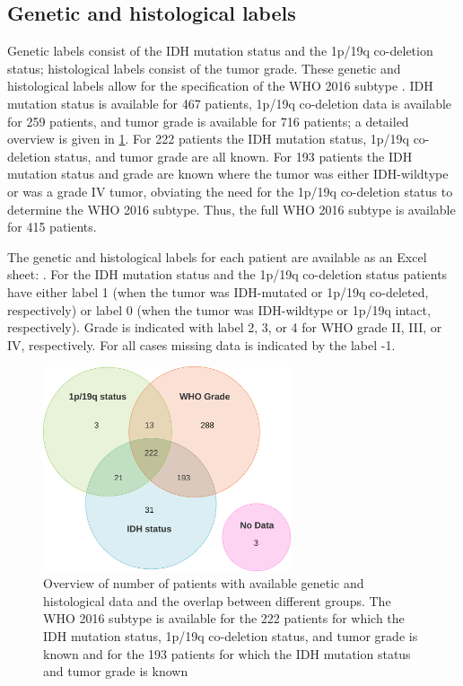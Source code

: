 \subsection{Genetic and histological labels}
Genetic labels consist of the \gls{IDH} mutation status and the 1p/19q co-deletion status; histological labels consist of the \gls{tumor} grade.
These genetic and histological labels allow for the specification of the \gls{WHO} 2016 subtype \autocite{louis20162016}.
\gls{IDH} mutation status is available for 467 patients, 1p/19q co-deletion data is available for 259 patients, and \gls{tumor} grade is available for 716 patients; a detailed overview is given in \cref{fig:egd_venn_histo}.
For 222 patients the \gls{IDH} mutation status, 1p/19q co-deletion status, and \gls{tumor} grade are all known.
For 193 patients the \gls{IDH} mutation status and grade are known where the \gls{tumor} was either \gls{IDH}-wildtype or was a grade IV \gls{tumor}, obviating the need for the 1p/19q co-deletion status to determine the \gls{WHO} 2016 subtype.
Thus, the full \gls{WHO} 2016 subtype is available for 415 patients.

The genetic and histological labels for each patient are available as an Excel sheet: .
For the \gls{IDH} mutation status and the 1p/19q co-deletion status patients have either label 1 (when the \gls{tumor} was \gls{IDH}-mutated or 1p/19q co-deleted, respectively) or label 0 (when the \gls{tumor} was \gls{IDH}-wildtype or 1p/19q intact, respectively).
Grade is indicated with label 2, 3, or 4 for \gls{WHO} grade II, III, or IV, respectively.
For all cases missing data is indicated by the label -1.

\begin{figure}
  \centering
  \includegraphics[width=0.65\textwidth]{Figures/venn_diagram_genetic_and_histological.png}
  \caption{Overview of number of patients with available genetic and histological data and the overlap between different groups.
  The \acrshort{WHO} 2016 subtype is available for the 222 patients for which the \acrshort{IDH} mutation status, 1p/19q co-deletion status, and \gls{tumor} grade is known and for the 193 patients for which the \acrshort{IDH} mutation status and \gls{tumor} grade is known}\label{fig:egd_venn_histo}
\end{figure}


